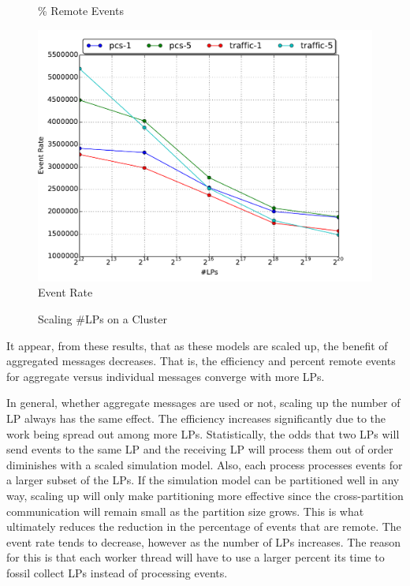 \documentclass[11pt]{book}
\begin{document}
\begin{figure}
\begin{minipage}{.5\textwidth}
\begin{center}
      \% Remote Events \\
    \end{center}
  \end{minipage}
  \centering
  \begin{minipage}{.5\textwidth}
    \begin{center}
      \includegraphics[width=\textwidth,keepaspectratio,quiet]{figs/scale/scale_event_rate.pdf} \\
      Event Rate \\
    \end{center}
  \end{minipage}
  \caption{Scaling \#LPs on a Cluster}\label{scaling}
\end{figure}

It appear, from these results, that as these models are scaled up, the benefit of aggregated
messages decreases.  That is, the efficiency and percent remote events for aggregate versus
individual messages converge with more LPs.

In general, whether aggregate messages are used or not, scaling up the number of LP always has
the same effect.  The efficiency increases significantly due to the work being spread out among
more LPs.  Statistically, the odds that two LPs will send events to the same LP and the receiving
LP will process them out of order diminishes with a scaled simulation model.
Also, each process processes events for a larger subset of the LPs.  If the simulation model can
be partitioned well in any way, scaling up will only make partitioning more effective since
the cross-partition communication will remain small as the partition size grows.  This is what
ultimately reduces the reduction in the percentage of events that are remote.
The event rate tends to decrease, however as the number of LPs increases.  The reason for this
is that each worker thread will have to use a larger percent its time to fossil collect LPs
instead of processing events.
\end{document}
